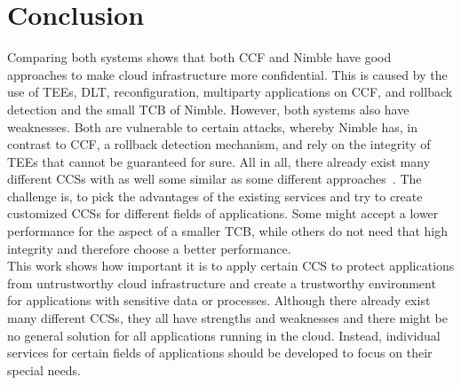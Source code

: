 \section{Conclusion}
Comparing both systems shows that both CCF and Nimble have good approaches to make cloud infrastructure more confidential. This is caused by the use of TEEs, DLT, reconfiguration, multiparty applications on CCF, and rollback detection and the small TCB of Nimble. However, both systems also have weaknesses. Both are vulnerable to certain attacks, whereby Nimble has, in contrast to CCF, a rollback detection mechanism, and rely on the integrity of TEEs that cannot be guaranteed for sure.
All in all, there already exist many different CCSs with as well some similar as some different approaches~\cite{rote, narrator, lcm}. The challenge is, to pick the advantages of the existing services and try to create customized CCSs for different fields of applications. Some might accept a lower performance for the aspect of a smaller TCB, while others do not need that high integrity and therefore choose a better performance.\\
 This work shows how important it is to apply certain CCS to protect applications from untrustworthy cloud infrastructure and create a trustworthy environment for applications with sensitive data or processes. Although there already exist many different CCSs, they all have strengths and weaknesses and there might be no general solution for all applications running in the cloud. Instead, individual services for certain fields of applications should be developed to focus on their special needs.